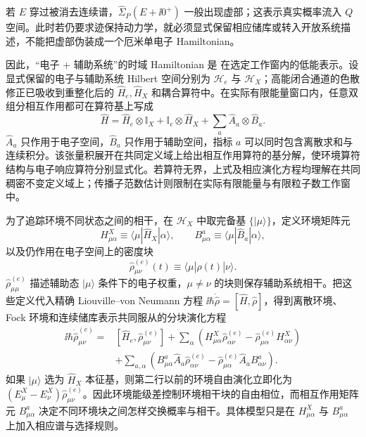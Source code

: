 若 $E$ 穿过被消去连续谱，$\hat\Sigma_P(E+\ii0^+)$ 一般出现虚部；这表示真实概率流入 $Q$ 空间。此时若仍要求迹保持动力学，就必须显式保留相应储库或转入开放系统描述，不能把虚部伪装成一个厄米单电子 Hamiltonian。



因此，“电子 + 辅助系统”的时域 Hamiltonian 是 在选定工作窗内的低能表示。设显式保留的电子与辅助系统 Hilbert 空间分别为 $\mathcal H_e$ 与 $\mathcal H_X$；高能闭合通道的色散修正已吸收到重整化后的 $\hat H_e,\hat H_X$ 和耦合算符中。在实际有限能量窗口内，任意双组分相互作用都可在算符基上写成
\begin{equation}
\boxed{
\hat H
=\hat H_e\otimes\mathbb I_X
+\mathbb I_e\otimes\hat H_X
+\sum_a\hat A_a\otimes\hat B_a .}
\label{eq:general_bipartite_hamiltonian}
\end{equation}
$\hat A_a$ 只作用于电子空间，$\hat B_a$ 只作用于辅助空间，指标 $a$ 可以同时包含离散求和与连续积分。该张量积展开在共同定义域上给出相互作用算符的基分解，使环境算符结构与电子响应算符分别显式化。若算符无界，上式及相应演化方程均理解在共同稠密不变定义域上；传播子范数估计则限制在实际有限能量与有限粒子数工作窗中。

为了追踪环境不同状态之间的相干，在 $\mathcal H_X$ 中取完备基 $\{|\mu\rangle\}$，定义环境矩阵元
\begin{equation*}
H^X_{\mu\alpha}\equiv\langle\mu|\hat H_X|\alpha\rangle,
\qquad
B^a_{\mu\alpha}\equiv\langle\mu|\hat B_a|\alpha\rangle,
\end{equation*}
以及仍作用在电子空间上的密度块
\begin{equation*}
\hat\rho^{(e)}_{\mu\nu}(t)
\equiv\langle\mu|\hat\rho(t)|\nu\rangle .
\end{equation*}
$\hat\rho^{(e)}_{\mu\mu}$ 描述辅助态 $|\mu\rangle$ 条件下的电子权重，$\mu\neq\nu$ 的块则保存辅助系统相干。把这些定义代入精确 Liouville--von Neumann 方程 $\ii\hbar\dot{\hat\rho}=[\hat H,\hat\rho]$，得到离散环境、Fock 环境和连续储库表示共同服从的分块演化方程
\begin{equation}
\boxed{
\begin{aligned}
\ii\hbar\dot{\hat\rho}^{(e)}_{\mu\nu}
={}&[\hat H_e,\hat\rho^{(e)}_{\mu\nu}]
+\sum_\alpha\left(
H^X_{\mu\alpha}\hat\rho^{(e)}_{\alpha\nu}
-\hat\rho^{(e)}_{\mu\alpha}H^X_{\alpha\nu}
\right)\\
&+\sum_{a,\alpha}\left(
B^a_{\mu\alpha}\hat A_a\hat\rho^{(e)}_{\alpha\nu}
-\hat\rho^{(e)}_{\mu\alpha}\hat A_a B^a_{\alpha\nu}
\right).
\end{aligned}}
\label{eq:general_bipartite_density_block_equation}
\end{equation}
如果 $|\mu\rangle$ 选为 $\hat H_X$ 本征基，则第二行以前的环境自由演化立即化为 $(E^X_\mu-E^X_\nu)\hat\rho^{(e)}_{\mu\nu}$。因此环境能级差控制环境相干块的自由相位，而相互作用矩阵元 $B^a_{\mu\alpha}$ 决定不同环境块之间怎样交换概率与相干。具体模型只是在 $H^X_{\mu\alpha}$ 与 $B^a_{\mu\alpha}$ 上加入相应谱与选择规则。

